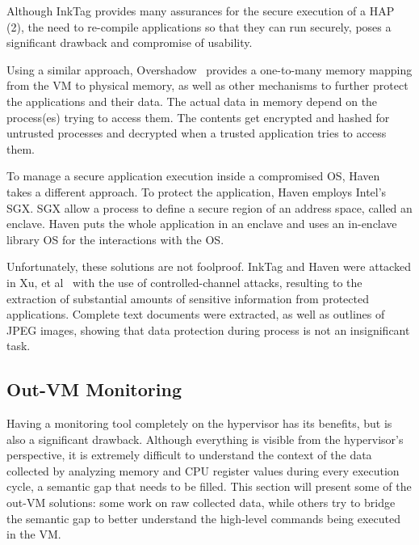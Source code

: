 \par Although InkTag provides many assurances for the secure execution of a \ac{HAP (2)}, the need to re-compile applications so that they can run securely, poses a significant drawback and compromise of usability.

\par Using a similar approach, Overshadow~\cite{chen2008overshadow} provides a one-to-many memory mapping from the \ac{VM} to physical memory, as well as other mechanisms to further protect the applications and their data. The actual data in memory depend on the process(es) trying to access them. The contents get encrypted and hashed for untrusted processes and decrypted when a trusted application tries to access them. 

\par To manage a secure application execution inside a compromised \ac{OS}, Haven~\cite{baumann2015shielding} takes a different approach. To protect the application, Haven employs Intel's \ac{SGX}. \ac{SGX} allow a process to define a secure region of an address space, called an enclave. Haven puts the whole application in an enclave and uses an in-enclave library \ac{OS} for the interactions with the \ac{OS}.

\par Unfortunately, these solutions are not foolproof. InkTag and Haven were attacked in Xu, et al~\cite{xu2015controlled} with the use of controlled-channel attacks, resulting to the extraction of substantial amounts of sensitive information from protected applications. Complete text documents were extracted, as well as outlines of JPEG images, showing that data protection during process is not an insignificant task. 


\subsection{Out-\ac{VM} Monitoring}\label{sub:outvm}
Having a monitoring tool completely on the hypervisor has its benefits, but is also a significant drawback. Although everything is visible from the hypervisor's perspective, it is extremely difficult to understand the context of the data collected by analyzing memory and \ac{CPU} register values during every execution cycle, a semantic gap that needs to be filled. This section will present some of the out-\ac{VM} solutions: some work on raw collected data, while others try to bridge the semantic gap to better understand the high-level commands being executed in the \ac{VM}.

